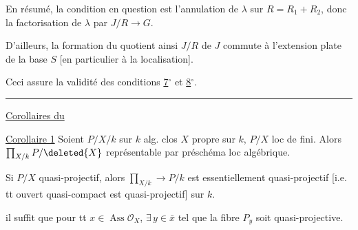 



En résumé, la condition en question est l'annulation de $\lambda$ sur $R=R_1+R_2$, donc la factorisation de $\lambda$ par $J/R\longrightarrow G$.

D'ailleurs, la formation du quotient ainsi  $J/R$ de $J$ commute à l'extension plate de la base $S$ [en particulier à la localisation].

Ceci assure la validité des conditions \uline{7$^\circ$} et \uline{8$^\circ$}.

\noindent\rule{\linewidth}{0.3pt}

\uline{Corollaires du }

\uline{Corollaire 1} Soient $P/X/k$ sur $k$ alg. clos  $X$ propre sur $k$, $P/X$ loc de  fini. Alors $\prod_{X/k}P/\deleted{X}$ représentable par préschéma loc  algébrique.

Si $P/X$ quasi-projectif, alors $\prod_{X/k}\longrightarrow{}P/k$ est essentiellement quasi-projectif [i.e. tt ouvert quasi-compact est quasi-projectif] sur $k$.

\unsure{$\swarrow$} il suffit que pour tt $x\in\operatorname{Ass}\mathcal O_X$, $\exists\,y\in\bar x$ tel que la fibre $P_y$ soit quasi-projective.

